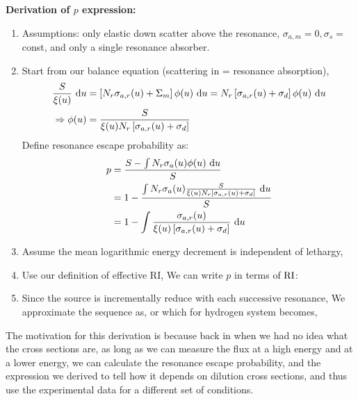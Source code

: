 \documentclass{school-22.211-notes}
\begin{document}
\textbf{Derivation of $p$ expression:}
\begin{enumerate}
\item Assumptions: only elastic down scatter above the resonance, $\sigma_{a,m} = 0, \sigma_{s} = $const, and only a single resonance absorber. 
\item Start from our balance equation (scattering in = resonance absorption),
\begin{align}
\frac{S}{\xi(u)} \mbox{ }\mathrm{d} u &= \left[ N_r \sigma_{a,r} (u) + \Sigma_m \right] \phi(u) \mbox{ }\mathrm{d} u = N_r \left[ \sigma_{a,r} (u) + \sigma_d \right] \phi(u) \mbox{ }\mathrm{d} u \\
\Rightarrow \phi(u) &= \frac{S}{\xi(u) N_r \left[ \sigma_{a,r} (u) + \sigma_d \right] } 
\end{align}
Define resonance escape probability as:
\begin{align}
p &= \frac{S - \int N_r \sigma_a(u) \phi(u) \mbox{ }\mathrm{d} u}{S} \\
&= 1 - \frac{\int N_r \sigma_a(u) \frac{S}{\xi(u) N_r \left[ \sigma_{a,r} (u) + \sigma_d \right] } \mbox{ }\mathrm{d} u }{S} \\
&= 1 - \int \frac{\sigma_{a,r} (u) }{\xi(u) \left[ \sigma_{a,r} (u) + \sigma_d \right] } \mbox{ }\mathrm{d} u
\end{align}
\item Assume the mean logarithmic energy decrement is independent of lethargy, 
\item Use our definition of effective RI,
We can write $p$ in terms of $\mathrm{RI}$:
\item Since the source is incrementally reduce with each successive resonance,
We approximate the sequence as,
or
which for hydrogen system becomes, 
\end{enumerate}
The motivation for this derivation is because back in when we had no idea what the cross sections are, as long as we can measure the flux at a high energy and at a lower energy, we can calculate the resonance escape probability, and the expression we derived to tell how it depends on dilution cross sections, and thus use the experimental data for a different set of conditions. 
\end{document}
